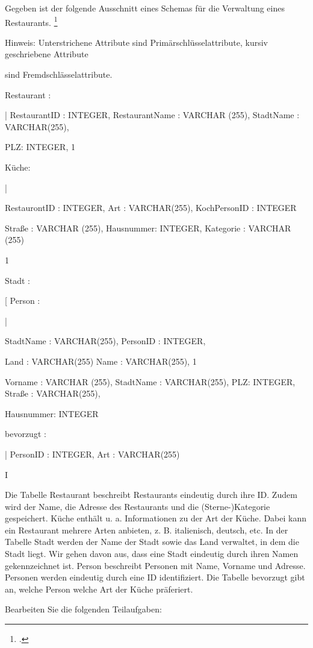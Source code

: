 \documentclass{bschlangaul-aufgabe}
\begin{document}

Gegeben ist der folgende Ausschnitt eines Schemas für die Verwaltung
eines Restaurants.
\footcite{examen:66116:2020:09}

Hinweis: Unterstrichene Attribute sind Primärschlüsselattribute, kursiv
geschriebene Attribute

sind Fremdschlässelattribute.

Restaurant : {|
RestaurantID : INTEGER,
RestaurantName : VARCHAR (255),
StadtName : VARCHAR(255),

PLZ: INTEGER, 1}

Küche: {|

RestaurontID : INTEGER,
Art : VARCHAR(255),
KochPersonID : INTEGER

Straße : VARCHAR (255),
Hausnummer: INTEGER,
Kategorie : VARCHAR (255)

1}

Stadt : {[ Person : {|

StadtName : VARCHAR(255), PersonID : INTEGER,

Land : VARCHAR(255) Name : VARCHAR(255),
1} Vorname : VARCHAR (255),
StadtName : VARCHAR(255),
PLZ: INTEGER,
Straße : VARCHAR(255),

Hausnummer: INTEGER

bevorzugt : {|
PersonID : INTEGER,
Art : VARCHAR(255)

} I}

Die Tabelle Restaurant beschreibt Restaurants eindeutig durch ihre ID.
Zudem wird der Name, die Adresse des Restaurants und die
(Sterne-)Kategorie gespeichert. Küche enthält u. a. Informationen zu der
Art der Küche. Dabei kann ein Restaurant mehrere Arten anbieten, z. B.
italienisch, deutsch, etc. In der Tabelle Stadt werden der Name der
Stadt sowie das Land verwaltet, in dem die Stadt liegt. Wir gehen davon
aus, dass eine Stadt eindeutig durch ihren Namen gekennzeichnet ist.
Person beschreibt Personen mit Name, Vorname und Adresse. Personen
werden eindeutig durch eine ID identifiziert. Die Tabelle bevorzugt gibt
an, welche Person welche Art der Küche präferiert.

Bearbeiten Sie die folgenden Teilaufgaben:
\end{document}

